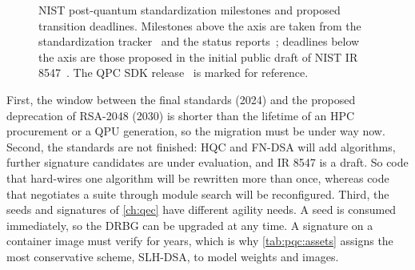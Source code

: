 \begin{figure}[htbp]
\caption{NIST post-quantum standardization milestones and proposed transition deadlines. Milestones above the axis are taken from the standardization tracker~\cite{guo2026nisttracker} and the status reports~\cite{nist2022ir8413,nist2025ir8545}; deadlines below the axis are those proposed in the initial public draft of NIST IR 8547~\cite{nist2024ir8547}. The QPC SDK release~\cite{guo2026lightriderqpc} is marked for reference.}
\label{fig:pqc:timeline}
\end{figure}

First, the window between the final standards (2024) and the proposed deprecation of RSA-2048 (2030) is shorter than the lifetime of an HPC procurement or a QPU generation, so the migration must be under way now. Second, the standards are not finished: HQC and FN-DSA will add algorithms, further signature candidates are under evaluation, and IR 8547 is a draft. So code that hard-wires one algorithm will be rewritten more than once, whereas code that negotiates a suite through module search will be reconfigured. Third, the seeds and signatures of \cref{ch:qec} have different agility needs. A seed is consumed immediately, so the DRBG can be upgraded at any time. A signature on a container image must verify for years, which is why \cref{tab:pqc:assets} assigns the most conservative scheme, SLH-DSA, to model weights and images.

